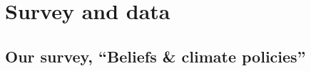 \documentclass[11pt]{article}
\begin{document}



\section{Survey and data} \label{sec:survey}

\subsection{Our survey, ``Beliefs \& climate policies''\label{subsec:Survey-Beliefs-climate}}
\end{document}

